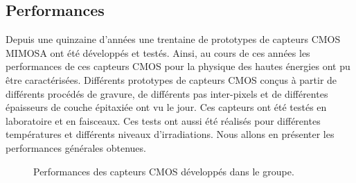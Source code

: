    
   \subsection{Performances}
   
   Depuis une quinzaine d'ann\'ees une trentaine de prototypes de capteurs CMOS MIMOSA ont \'et\'e d\'evelopp\'es et test\'es. Ainsi, au cours de ces ann\'ees les performances de ces capteurs CMOS pour la physique des hautes \'energies ont pu \^etre caract\'eris\'ees. Diff\'erents prototypes de capteurs CMOS con\c{c}us \`a partir de diff\'erents proc\'ed\'es de gravure, de diff\'erents pas inter-pixels et de diff\'erentes \'epaisseurs de couche \'epitaxi\'ee ont vu le jour. Ces capteurs ont \'et\'e test\'es en laboratoire et en faisceaux. Ces tests ont aussi \'et\'e r\'ealis\'es pour diff\'erentes temp\'eratures et diff\'erents niveaux d'irradiations. Nous allons en pr\'esenter les performances g\'en\'erales obtenues.
  
   \medskip
   
  \begin{figure}[!htb]
   \begin{center}
   \caption{Performances des capteurs CMOS d\'eveloppés dans le groupe.}
   \label{fig:Ultimate}
   \end{center}
  \end{figure}
  

